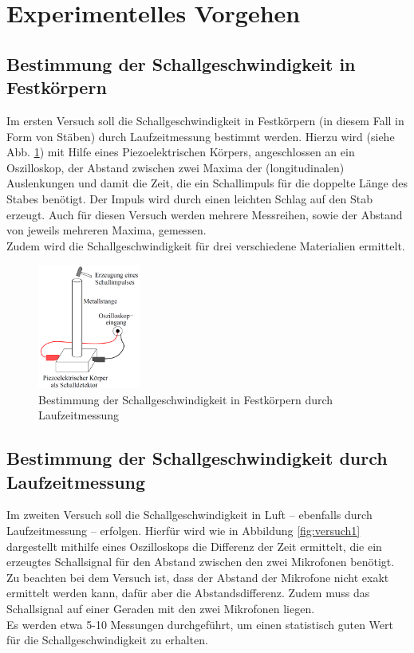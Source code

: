 \section{Experimentelles Vorgehen}

\subsection{Bestimmung der Schallgeschwindigkeit in Festkörpern}
Im ersten Versuch soll die Schallgeschwindigkeit in Festkörpern (in diesem Fall in Form von Stäben) durch Laufzeitmessung bestimmt werden. Hierzu wird (siehe Abb. \ref{fig:versuch2}) mit Hilfe eines Piezoelektrischen Körpers, angeschlossen an ein Oszilloskop, der Abstand zwischen zwei Maxima der (longitudinalen) Auslenkungen und damit die Zeit, die ein Schallimpuls für die doppelte Länge des Stabes benötigt. Der Impuls wird durch einen leichten Schlag auf den Stab erzeugt. Auch für diesen Versuch werden mehrere Messreihen, sowie der Abstand von jeweils mehreren Maxima, gemessen.\\
Zudem wird die Schallgeschwindigkeit für drei verschiedene Materialien ermittelt.

\begin{figure}
\begin{center}
\includegraphics[width=0.3\textwidth]{Bilder/Versuchsaufbau2.png}
\caption{Bestimmung der Schallgeschwindigkeit in Festkörpern durch Laufzeitmessung}
\label{fig:versuch2}
\end{center}
\end{figure}


\subsection{Bestimmung der Schallgeschwindigkeit durch Laufzeitmessung}
Im zweiten Versuch soll die Schallgeschwindigkeit in Luft -- ebenfalls durch Laufzeitmessung -- erfolgen. Hierfür wird wie in Abbildung \ref{fig:versuch1} dargestellt mithilfe eines Oszilloskops die Differenz der Zeit ermittelt, die ein erzeugtes Schallsignal für den Abstand zwischen den zwei Mikrofonen benötigt. Zu beachten bei dem Versuch ist, dass der Abstand der Mikrofone nicht exakt ermittelt werden kann, dafür aber die Abstandsdifferenz. Zudem muss das Schallsignal auf einer Geraden mit den zwei Mikrofonen liegen.\\
Es werden etwa 5-10 Messungen durchgeführt, um einen statistisch guten Wert für die Schallgeschwindigkeit zu erhalten.

